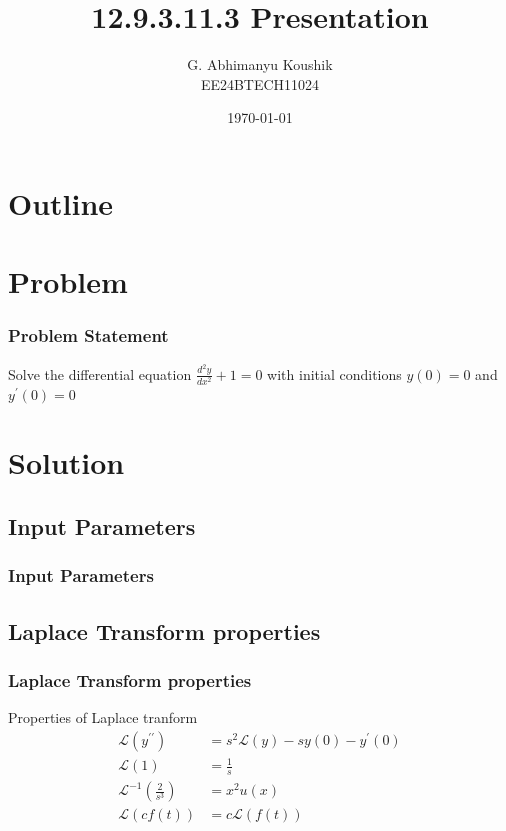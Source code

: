 \documentclass{beamer}
\title{12.9.3.11.3 Presentation}
\author{G. Abhimanyu Koushik \\ EE24BTECH11024}
\date{\today}
\providecommand{\brak}[1]{\ensuremath{\left(#1\right)}}
\theoremstyle{remark}
\numberwithin{equation}{section}
\begin{document}
\begin{frame}
\titlepage
\end{frame}

\section*{Outline}
\begin{frame}
\tableofcontents
\end{frame}
\section{Problem}
\begin{frame}
\frametitle{Problem Statement}
%
Solve the differential equation $\frac{d^2y}{dx^2} + 1 = 0$ with initial conditions $y\brak{0} = 0$ and $y^{\prime}\brak{0} = 0$
%
\end{frame}

\section{Solution}
\subsection{Input Parameters}
\begin{frame}
\frametitle{Input Parameters}
\begin{table}[H]    
  \centering
  
\end{table}
\end{frame}
\subsection{Laplace Transform properties}
\begin{frame}
\frametitle{Laplace Transform properties}
Properties of Laplace tranform
\begin{align}
	\mathcal{L}\brak{y^{\prime\prime}} &= s^2\mathcal{L}\brak{y} -sy\brak{0}-y^\prime\brak{0}\\
	\mathcal{L}\brak{1} &= \frac{1}{s}\\
	\mathcal{L}^{-1}\brak{\frac{2}{s^3}} &= x^2u\brak{x}\\
	\mathcal{L}\brak{cf\brak{t}} &= c\mathcal{L}\brak{f\brak{t}}
\end{align}
%
\end{frame}
\end{document}
